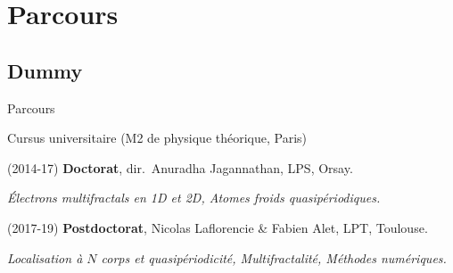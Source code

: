 \section*{Parcours}
\subsection{Dummy}
\begin{frame}{Parcours}
\begin{block}{}
Cursus universitaire (M2 de physique théorique, Paris)
\end{block}
%
\begin{block}{}
(2014-17) \textbf{Doctorat}, dir.\ Anuradha Jagannathan, LPS, Orsay.

\emph{Électrons multifractals en 1D et 2D, Atomes froids quasipériodiques.}
\end{block}
%
\begin{block}{}
(2017-19) \textbf{Postdoctorat}, Nicolas Laflorencie \& Fabien Alet, LPT, Toulouse.

\emph{Localisation à $N$ corps et quasipériodicité, Multifractalité, Méthodes numériques.}
\end{block}
\end{frame}
